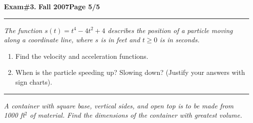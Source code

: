 \documentclass[12pt]{article}
\begin{document}
\hfill{\large\bf Exam\#3.}\hfill{\large\bf
  Fall 2007}\hfill{\large\bf Page 5/5}\hrule

\bigskip
{}
{\problem[20 pts] \em The function $s(t) = t^4 - 4t^2 + 4$ describes the position of a particle moving along a coordinate line, where $s$ is in feet and $t \geq 0$ is in seconds.}
\begin{enumerate}
\item Find the velocity and acceleration functions.
\item When is the particle speeding up? Slowing down? (Justify your answers with sign charts).
\end{enumerate}
\vspace{9cm}
\hrule
{\problem[20 pts] \em A container with square base, vertical sides, and open top is to be made from 1000 ft$^2$ of material.  Find the dimensions of the container with greatest volume.}
\vspace{7cm}
\begin{flushright}
\end{flushright}
\end{document}
